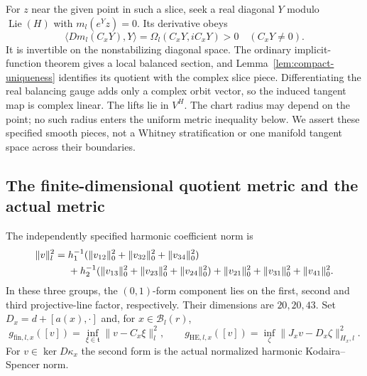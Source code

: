 \documentclass[11pt]{amsart}
\theoremstyle{definition}
\theoremstyle{remark}
\newcommand{\cB}{\mathcal B}
\newcommand{\Lie}{\operatorname{Lie}}
\begin{document}
For $z$ near the given point in such a slice, seek a real diagonal
$Y$ modulo $\Lie(H)$ with $m_l(e^Yz)=0$. Its derivative obeys
\[
 \langle Dm_l(C_xY),Y\rangle
       =\Omega_l(C_xY,iC_xY)>0\quad(C_xY\ne0).
\]
It is invertible on the nonstabilizing diagonal space. The ordinary
implicit-function theorem gives a local balanced section, and
Lemma~\ref{lem:compact-uniqueness} identifies its quotient with the
complex slice piece. Differentiating the real balancing gauge adds
only a complex orbit vector, so the induced tangent map is complex
linear. The lifts lie in $V^H$. The chart radius may depend on the
point; no such radius enters the uniform metric inequality below.
We assert these specified smooth pieces, not a Whitney stratification
or one manifold tangent space across their boundaries.

\subsection{The finite-dimensional quotient metric and the actual metric}
The independently specified harmonic coefficient norm is
\begin{align}
 \|v\|_l^2={}&h_1^{-1}(\|v_{12}\|_0^2+\|v_{32}\|_0^2+\|v_{34}\|_0^2)
 \notag\\
 &+h_2^{-1}(\|v_{13}\|_0^2+\|v_{23}\|_0^2+\|v_{24}\|_0^2)
 +\|v_{21}\|_0^2+\|v_{31}\|_0^2+\|v_{41}\|_0^2.
 \label{eq:wall-coefficient-norm}
\end{align}
In these three groups, the $(0,1)$-form component lies on the
first, second and third projective-line factor, respectively. Their dimensions are
$20,20,43$. Set $D_x=d+[a(x),\cdot]$ and, for $x\in\cB_l(r)$,
\begin{equation}\label{eq:full-quotient-forms}
 g_{\mathrm{fin},l,x}([v])=\inf_{\xi\in\mathfrak t}\|v-C_x\xi\|_l^2,
 \qquad
 g_{\mathrm{HE},l,x}([v])=
 \inf_\zeta\|J_xv-D_x\zeta\|_{H_x,l}^2.
\end{equation}
For $v\in\ker D\kappa_x$ the second form is the actual normalized
harmonic Kodaira--Spencer norm.
\end{document}
